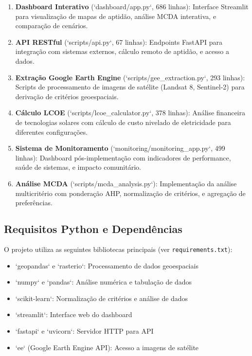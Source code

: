 \documentclass[12pt, a4paper]{article}
\begin{document}
\begin{enumerate}
    \item \textbf{Dashboard Interativo} (`dashboard/app.py`, 686 linhas): Interface Streamlit para visualização de mapas de aptidão, análise MCDA interativa, e comparação de cenários.
    
    \item \textbf{API RESTful} (`scripts/api.py`, 67 linhas): Endpoints FastAPI para integração com sistemas externos, cálculo remoto de aptidão, e acesso a dados.
    
    \item \textbf{Extração Google Earth Engine} (`scripts/gee\_extraction.py`, 293 linhas): Scripts de processamento de imagens de satélite (Landsat 8, Sentinel-2) para derivação de critérios geoespaciais.
    
    \item \textbf{Cálculo LCOE} (`scripts/lcoe\_calculator.py`, 378 linhas): Análise financeira de tecnologias solares com cálculo de custo nivelado de eletricidade para diferentes configurações.
    
    \item \textbf{Sistema de Monitoramento} (`monitoring/monitoring\_app.py`, 499 linhas): Dashboard pós-implementação com indicadores de performance, saúde de sistemas, e impacto comunitário.
    
    \item \textbf{Análise MCDA} (`scripts/mcda\_analysis.py`): Implementação da análise multicritério com ponderação AHP, normalização de critérios, e agregação de preferências.
\end{enumerate}

\subsection{Requisitos Python e Dependências}

O projeto utiliza as seguintes bibliotecas principais (ver \texttt{requirements.txt}):
\begin{itemize}
    \item `geopandas` e `rasterio`: Processamento de dados geoespaciais
    \item `numpy` e `pandas`: Análise numérica e tabulação de dados
    \item `scikit-learn`: Normalização de critérios e análise de dados
    \item `streamlit`: Interface web do dashboard
    \item `fastapi` e `uvicorn`: Servidor HTTP para API
    \item `ee` (Google Earth Engine API): Acesso a imagens de satélite
\end{itemize}
\end{document}
